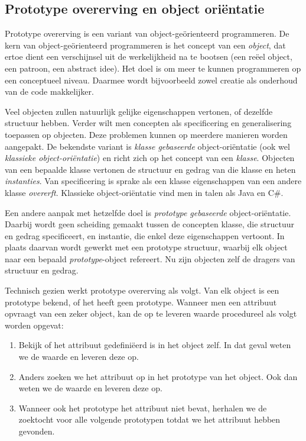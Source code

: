 \subsection{Prototype overerving en object oriëntatie}
\label{sec:taal-prototypen}

Prototype overerving is een variant van object-geörienteerd programmeren. De kern van object-geörienteerd programmeren is het concept van een \emph{object}, dat ertoe dient een verschijnsel uit de werkelijkheid na te bootsen (een reëel object, een patroon, een abstract idee). Het doel is om meer te kunnen programmeren op een conceptueel niveau. Daarmee wordt bijvoorbeeld zowel creatie als onderhoud van de code makkelijker.

Veel objecten zullen natuurlijk gelijke eigenschappen vertonen, of dezelfde structuur hebben. Verder wilt men concepten als specificering en generalisering toepassen op objecten. Deze problemen kunnen op meerdere manieren worden aangepakt. De bekendste variant is \emph{klasse gebaseerde} object-oriëntatie (ook wel \emph{klassieke object-oriëntatie}) en richt zich op het concept van een \emph{klasse}. Objecten van een bepaalde klasse vertonen de structuur en gedrag van die klasse en heten \emph{instanties}. Van specificering is sprake als een klasse eigenschappen van een andere klasse \emph{overerft}. Klassieke object-oriëntatie vind men in talen als Java en C\#.

Een andere aanpak met hetzelfde doel is \emph{prototype gebaseerde} object-oriëntatie. Daarbij wordt geen scheiding gemaakt tussen de concepten klasse, die structuur en gedrag specificeert, en instantie, die enkel deze eigenschappen vertoont. In plaats daarvan wordt gewerkt met een prototype structuur, waarbij elk object naar een bepaald \emph{prototype}-object refereert. Nu zijn objecten zelf de dragers van structuur en gedrag.

Technisch gezien werkt prototype overerving als volgt. Van elk object is een prototype bekend, of het heeft geen prototype. Wanneer men een attribuut opvraagt van een zeker object, kan de op te leveren waarde procedureel als volgt worden opgevat:

\begin{enumerate}
  \item Bekijk of het attribuut gedefiniëerd is in het object zelf. In dat geval weten we de waarde en leveren deze op.
  \item Anders zoeken we het attribuut op in het prototype van het object. Ook dan weten we de waarde en leveren deze op.
  \item Wanneer ook het prototype het attribuut niet bevat, herhalen we de zoektocht voor alle volgende prototypen totdat we het attribuut hebben gevonden.
\end{enumerate}


